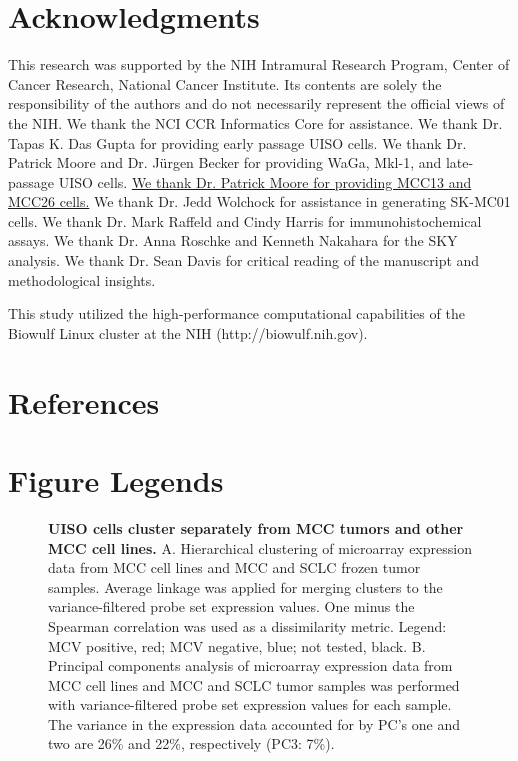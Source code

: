 \documentclass[10pt]{article}
\begin{document}
\section*{Acknowledgments}
This research was supported by the NIH Intramural Research Program, Center of Cancer Research, National Cancer Institute.
Its contents are solely the responsibility of the authors and do not necessarily represent the official views of the NIH.
We thank the NCI CCR Informatics Core for assistance.
We thank Dr. Tapas K. Das Gupta for providing early passage UISO cells.
We thank Dr. Patrick Moore and Dr. J\"{u}rgen Becker for providing WaGa, Mkl-1, and late-passage UISO cells.
\uline{We thank Dr. Patrick Moore for providing MCC13 and MCC26 cells.}
We thank Dr. Jedd Wolchock for assistance in generating SK-MC01 cells.
We thank Dr. Mark Raffeld and Cindy Harris for immunohistochemical assays.
We thank Dr. Anna Roschke and Kenneth Nakahara for the SKY analysis.
We thank Dr. Sean Davis for critical reading of the manuscript and methodological insights.

This study utilized the high-performance computational capabilities of the Biowulf Linux cluster at the NIH (http://biowulf.nih.gov).

\section*{References}
\begin{singlespace}

\end{singlespace}

\newpage

\section*{Figure Legends}

\begin{figure}[!ht]
  \begin{center}
  \end{center}
  
  \caption{
    {\bf UISO cells cluster separately from MCC tumors and other MCC cell lines.}
    A. Hierarchical clustering of microarray expression data from MCC cell lines and MCC and SCLC frozen tumor samples.
    Average linkage was applied for merging clusters to the variance-filtered probe set expression values.
    One minus the Spearman correlation was used as a dissimilarity metric.
    Legend: MCV positive, red; MCV negative, blue; not tested, black.
    B. Principal components analysis of microarray expression data from MCC cell lines and MCC and SCLC tumor samples was performed with variance-filtered probe set expression values for each sample.
    The variance in the expression data accounted for by PC’s one and two are 26\% and 22\%, respectively (PC3: 7\%).}
  
  \label{fig:clustering}

\end{figure}
\end{document}
